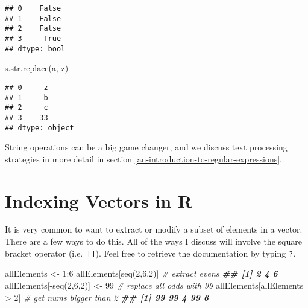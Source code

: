 \documentclass[
  12pt,
  krantz2]{krantz}
\makeatletter
\newenvironment{Shaded}{\begin{snugshade}}{\end{snugshade}}
\newcommand{\BuiltInTok}[1]{#1}
\newcommand{\CommentTok}[1]{\textcolor[rgb]{0.37,0.37,0.37}{\textit{#1}}}
\newcommand{\DecValTok}[1]{\textcolor[rgb]{0.06,0.06,0.06}{#1}}
\newcommand{\DocumentationTok}[1]{\textcolor[rgb]{0.37,0.37,0.37}{\textbf{\textit{#1}}}}
\newcommand{\FunctionTok}[1]{\textcolor[rgb]{0,0,0}{#1}}
\newcommand{\NormalTok}[1]{#1}
\newcommand{\OtherTok}[1]{\textcolor[rgb]{0.37,0.37,0.37}{#1}}
\newcommand{\SpecialCharTok}[1]{\textcolor[rgb]{0,0,0}{#1}}
\newcommand{\StringTok}[1]{\textcolor[rgb]{0.5,0.5,0.5}{#1}}
\newenvironment{kframe}{%
\medskip{}
\setlength{\fboxsep}{.8em}
 \def\at@end@of@kframe{}%
 \ifinner\ifhmode%
  \def\at@end@of@kframe{\end{minipage}}%
  \begin{minipage}{\columnwidth}%
 \fi\fi%
 \def\FrameCommand##1{\hskip\@totalleftmargin \hskip-\fboxsep
 \colorbox{shadecolor}{##1}\hskip-\fboxsep
     \hskip-\linewidth \hskip-\@totalleftmargin \hskip\columnwidth}%
 \MakeFramed {\advance\hsize-\width
   \@totalleftmargin\z@ \linewidth\hsize
   \@setminipage}}%
 {\par\unskip\endMakeFramed%
 \at@end@of@kframe}
\renewenvironment{Shaded}{\begin{kframe}}{\end{kframe}}
\makeatother
\begin{document}
\begin{verbatim}
## 0    False
## 1    False
## 2    False
## 3     True
## dtype: bool
\end{verbatim}

\begin{Shaded}
\begin{Highlighting}[]
\NormalTok{s.}\BuiltInTok{str}\NormalTok{.replace(}\StringTok{\textquotesingle{}a\textquotesingle{}}\NormalTok{, }\StringTok{\textquotesingle{}z\textquotesingle{}}\NormalTok{)}
\end{Highlighting}
\end{Shaded}

\begin{verbatim}
## 0     z
## 1     b
## 2     c
## 3    33
## dtype: object
\end{verbatim}

String operations can be a big game changer, and we discuss text processing strategies in more detail in section \ref{an-introduction-to-regular-expressions}.

\hypertarget{indexing-vectors-in-r}{%
\section{Indexing Vectors in R}\label{indexing-vectors-in-r}}

It is very common to want to extract or modify a subset of elements in a vector. There are a few ways to do this. All of the ways I discuss will involve the square bracket operator (i.e.~\texttt{{[}{]}}). Feel free to retrieve the documentation by typing \texttt{?\textquotesingle{}{[}\textquotesingle{}}.

\begin{Shaded}
\begin{Highlighting}[]
\NormalTok{allElements }\OtherTok{\textless{}{-}} \DecValTok{1}\SpecialCharTok{:}\DecValTok{6}
\NormalTok{allElements[}\FunctionTok{seq}\NormalTok{(}\DecValTok{2}\NormalTok{,}\DecValTok{6}\NormalTok{,}\DecValTok{2}\NormalTok{)] }\CommentTok{\# extract evens}
\DocumentationTok{\#\# [1] 2 4 6}
\NormalTok{allElements[}\SpecialCharTok{{-}}\FunctionTok{seq}\NormalTok{(}\DecValTok{2}\NormalTok{,}\DecValTok{6}\NormalTok{,}\DecValTok{2}\NormalTok{)] }\OtherTok{\textless{}{-}} \DecValTok{99} \CommentTok{\# replace all odds with 99}
\NormalTok{allElements[allElements }\SpecialCharTok{\textgreater{}} \DecValTok{2}\NormalTok{] }\CommentTok{\# get nums bigger than 2}
\DocumentationTok{\#\# [1] 99 99  4 99  6}
\end{Highlighting}
\end{Shaded}
\end{document}
